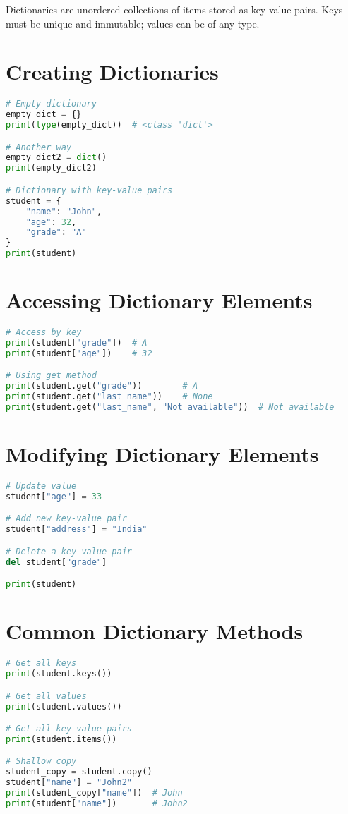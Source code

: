 Dictionaries are unordered collections of items stored as key-value pairs.  
Keys must be unique and immutable; values can be of any type.

\section{Creating Dictionaries}

\begin{lstlisting}[language=Python]
# Empty dictionary
empty_dict = {}
print(type(empty_dict))  # <class 'dict'>

# Another way
empty_dict2 = dict()
print(empty_dict2)

# Dictionary with key-value pairs
student = {
    "name": "John",
    "age": 32,
    "grade": "A"
}
print(student)
\end{lstlisting}

\section{Accessing Dictionary Elements}

\begin{lstlisting}[language=Python]
# Access by key
print(student["grade"])  # A
print(student["age"])    # 32

# Using get method
print(student.get("grade"))        # A
print(student.get("last_name"))    # None
print(student.get("last_name", "Not available"))  # Not available
\end{lstlisting}

\section{Modifying Dictionary Elements}

\begin{lstlisting}[language=Python]
# Update value
student["age"] = 33

# Add new key-value pair
student["address"] = "India"

# Delete a key-value pair
del student["grade"]

print(student)
\end{lstlisting}

\section{Common Dictionary Methods}

\begin{lstlisting}[language=Python]
# Get all keys
print(student.keys())

# Get all values
print(student.values())

# Get all key-value pairs
print(student.items())

# Shallow copy
student_copy = student.copy()
student["name"] = "John2"
print(student_copy["name"])  # John
print(student["name"])       # John2
\end{lstlisting}

